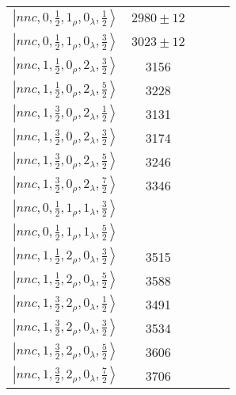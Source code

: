 \documentclass[twocolumn,superscriptaddress,preprintnumbers,nofootinbib]{revtex4}
\begin{document}
\begin{table*}[htbp]
\begin{tabular}{ccccc}
 $\left| nnc,0, \frac{1}{2},1_{\rho},0_{\lambda}, \frac{1}{2} \right\rangle  $ &  $2980 \pm 12$ &  &  &  \\
  $\left| nnc,0, \frac{1}{2},1_{\rho},0_{\lambda}, \frac{3}{2} \right\rangle $ & $3023 \pm 12$ &  &  &  \\
 $\left| nnc,1, \frac{1}{2},0_{\rho},2_{\lambda}, \frac{3}{2} \right\rangle  $&3156 & & &  \\
$\left| nnc,1, \frac{1}{2},0_{\rho},2_{\lambda}, \frac{5}{2} \right\rangle  $&3228 & & &  \\
 $\left| nnc,1, \frac{3}{2},0_{\rho},2_{\lambda}, \frac{1}{2} \right\rangle  $&3131 & & &  \\
 $\left| nnc,1, \frac{3}{2},0_{\rho},2_{\lambda}, \frac{3}{2} \right\rangle  $&3174 & & &  \\
 $\left| nnc,1, \frac{3}{2},0_{\rho},2_{\lambda}, \frac{5}{2} \right\rangle  $&3246 & & &  \\
 $\left| nnc,1, \frac{3}{2},0_{\rho},2_{\lambda}, \frac{7}{2} \right\rangle  $& 3346& & &  \\
$\left| nnc,0, \frac{1}{2},1_{\rho},1_{\lambda}, \frac{3}{2} \right\rangle  $& & & &  \\
$\left| nnc,0, \frac{1}{2},1_{\rho},1_{\lambda}, \frac{5}{2} \right\rangle  $& & & &  \\
$\left| nnc,1, \frac{1}{2},2_{\rho},0_{\lambda}, \frac{3}{2} \right\rangle  $&3515 & & &  \\
$\left| nnc,1, \frac{1}{2},2_{\rho},0_{\lambda}, \frac{5}{2} \right\rangle  $&3588 & & &  \\
$\left| nnc,1, \frac{3}{2},2_{\rho},0_{\lambda}, \frac{1}{2} \right\rangle  $&3491 & & &  \\
$\left| nnc,1, \frac{3}{2},2_{\rho},0_{\lambda}, \frac{3}{2} \right\rangle  $& 3534& & &  \\
$\left| nnc,1, \frac{3}{2},2_{\rho},0_{\lambda}, \frac{5}{2} \right\rangle  $&3606 & & &  \\
$\left| nnc,1, \frac{3}{2},2_{\rho},0_{\lambda}, \frac{7}{2} \right\rangle  $&3706& & &  \\
\hline
\hline
\hline
\end{tabular}
\label{tab:widthsSigmac}
\end{table*}
\end{document}
